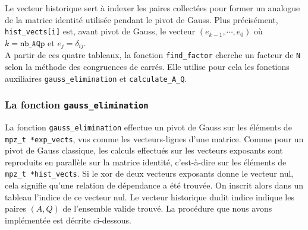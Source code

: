 Le vecteur historique sert à indexer les paires collectées pour former
un analogue de la matrice identité utilisée pendant le pivot de Gauss. 
Plus précisément, \texttt{hist\_vects[i]} est, avant pivot de Gauss, le
vecteur $(e_{k-1}, \cdots, e_0)$ où $k=\texttt{nb\_AQp}$ et $e_j = 
\delta_{ij}$.\\ 

A partir de ces quatre tableaux, la fonction \texttt{find\_factor} cherche 
un facteur de \texttt{N} selon la méthode des congruences de carrés. Elle
utilise pour cela les fonctions auxiliaires \texttt{gauss\_elimination} et
\texttt{calculate\_A\_Q}. 

\subsubsection{La fonction \texttt{gauss\_elimination}}

La fonction \texttt{gauss\_elimination} effectue un pivot de Gauss sur les
éléments de \texttt{mpz\_t *exp\_vects}, vus comme les vecteurs-lignes
d'une matrice. Comme pour un pivot de Gauss classique, les calculs effectués
sur les vecteurs exposants sont reproduits en parallèle sur la matrice identité,
c'est-à-dire sur les éléments de \texttt{mpz\_t *hist\_vects}. Si le xor de deux
vecteurs exposants donne le vecteur nul, cela 
signifie qu'une relation de dépendance a été trouvée. On inscrit alors dans un
tableau l'indice de ce vecteur nul. Le vecteur historique dudit indice indique 
les paires $(A,Q)$ de l'ensemble valide trouvé. La procédure que nous avons
implémentée est décrite ci-dessous. 

